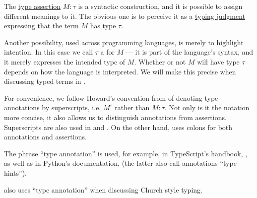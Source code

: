 \begin{concept}\label{con:type_annotation}
  The \hyperref[def:type_assertion]{type assertion} \( M: \tau \) is a syntactic construction, and it is possible to assign different meanings to it. The obvious one is to perceive it as a \hyperref[rem:typing_judgments]{typing judgment} expressing that the term \( M \) has type \( \tau \).

  Another possibility, used across programming languages, is merely to highlight intention. In this case we call \( \tau \) a  for \( M \) --- it is part of the language's syntax, and it merely expresses the intended type of \( M \). Whether or not \( M \) will have type \( \tau \) depends on how the language is interpreted. We will make this precise when discussing typed terms in .

  For convenience, we follow Howard's convention from \cite{Howard1980FormulasAsTypes} of denoting type annotations by superscripts, i.e. \( M^\tau \) rather than \( M: \tau \). Not only is it the notation more concise, it also allows us to distinguish annotations from assertions. Superscripts are also used in \cite{Mimram2020Types} and \cite[ch. 5]{Hindley1997STT}. On the other hand,  uses colons for both annotations and assertions.
\end{concept}
\begin{comments}
  \item The phrase \enquote{type annotation} is used, for example, in TypeScript's handbook, \cite{TypeScript:5.7:handbook}, as well as in Python's documentation, \cite{PythonDocs:3.13:typing} (the latter also call annotations \enquote{type hints}).

   also uses \enquote{type annotation} when discussing Church style typing.
\end{comments}


